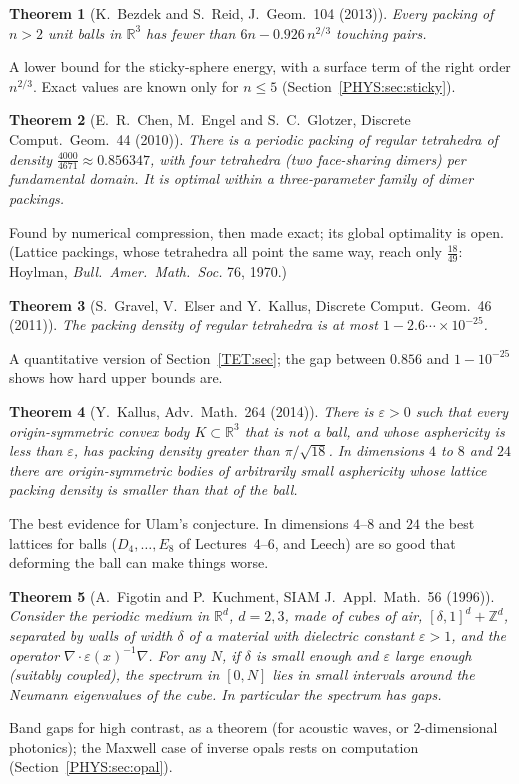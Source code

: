 \documentclass[11pt,openany]{book}
\theoremstyle{plain}
\newtheorem{theorem}{Theorem}[chapter]
\theoremstyle{definition}
\theoremstyle{remark}
\newcommand{\R}{\mathbb{R}}
\newcommand{\Z}{\mathbb{Z}}
\begin{document}
\begin{theorem}[K.~Bezdek and S.~Reid, J.\ Geom.\ 104 (2013)]\label{PHYS:thm:bezdek}
Every packing of $n>2$ unit balls in $\R^3$ has fewer than $6n-0.926\,n^{2/3}$ touching pairs.
\end{theorem}
\noindent A lower bound for the sticky-sphere energy, with a surface term of the right order $n^{2/3}$. Exact values
are known only for $n\le5$ (Section~\ref{PHYS:sec:sticky}).

\begin{theorem}[E.~R.~Chen, M.~Engel and S.~C.~Glotzer, Discrete Comput.\ Geom.\ 44 (2010)]\label{PHYS:thm:CEG}
There is a periodic packing of regular tetrahedra of density $\frac{4000}{4671}\approx0.856347$, with four
tetrahedra (two face-sharing dimers) per fundamental domain. It is optimal within a three-parameter family of
dimer packings.
\end{theorem}
\noindent Found by numerical compression, then made exact; its global optimality is open. (Lattice packings,
whose tetrahedra all point the same way, reach only $\frac{18}{49}$: Hoylman, \emph{Bull.\ Amer.\ Math.\ Soc.}
76, 1970.)

\begin{theorem}[S.~Gravel, V.~Elser and Y.~Kallus, Discrete Comput.\ Geom.\ 46 (2011)]\label{PHYS:thm:GEK}
The packing density of regular tetrahedra is at most $1-2.6\cdots\times10^{-25}$.
\end{theorem}
\noindent A quantitative version of Section~\ref{TET:sec}; the gap between $0.856$ and $1-10^{-25}$ shows how
hard upper bounds are.

\begin{theorem}[Y.~Kallus, Adv.\ Math.\ 264 (2014)]\label{PHYS:thm:kallus}
There is $\varepsilon>0$ such that every origin-symmetric convex body $K\subset\R^3$ that is not a ball, and whose
asphericity is less than $\varepsilon$, has packing density greater than $\pi/\sqrt{18}$. In dimensions $4$ to $8$ and
$24$ there are origin-symmetric bodies of arbitrarily small asphericity whose lattice packing density is
smaller than that of the ball.
\end{theorem}
\noindent The best evidence for Ulam's conjecture. In dimensions $4$--$8$ and $24$ the best lattices for balls
($D_4,\dots,E_8$ of Lectures~4--6, and Leech) are so good that deforming the ball can make things worse.

\begin{theorem}[A.~Figotin and P.~Kuchment, SIAM J.\ Appl.\ Math.\ 56 (1996)]\label{PHYS:thm:FK}
Consider the periodic medium in $\R^d$, $d=2,3$, made of cubes of air, $[\delta,1]^d+\Z^d$, separated by walls of
width $\delta$ of a material with dielectric constant $\varepsilon>1$, and the operator $\nabla\cdot\varepsilon(x)^{-1}\nabla$. For any
$N$, if $\delta$ is small enough and $\varepsilon$ large enough (suitably coupled), the spectrum in $[0,N]$ lies in small
intervals around the Neumann eigenvalues of the cube. In particular the spectrum has gaps.
\end{theorem}
\noindent Band gaps for high contrast, as a theorem (for acoustic waves, or $2$-dimensional photonics); the
Maxwell case of inverse opals rests on computation (Section~\ref{PHYS:sec:opal}).
\end{document}
